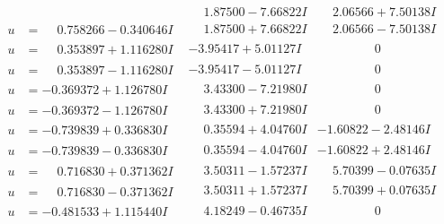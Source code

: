 \documentclass[1p]{elsarticle_modified}
\theoremstyle{definition}
\begin{document}
$$\begin{array}{c|c|c}
 & \phantom{-}1.87500 - 7.66822 I & \phantom{-}2.06566 + 7.50138 I \\ \hline\begin{aligned}
u &= \phantom{-}0.758266 - 0.340646 I\end{aligned}
 & \phantom{-}1.87500 + 7.66822 I & \phantom{-}2.06566 - 7.50138 I \\ \hline\begin{aligned}
u &= \phantom{-}0.353897 + 1.116280 I\end{aligned}
 & -3.95417 + 5.01127 I & \phantom{-0.000000 } 0 \\ \hline\begin{aligned}
u &= \phantom{-}0.353897 - 1.116280 I\end{aligned}
 & -3.95417 - 5.01127 I & \phantom{-0.000000 } 0 \\ \hline\begin{aligned}
u &= -0.369372 + 1.126780 I\end{aligned}
 & \phantom{-}3.43300 - 7.21980 I & \phantom{-0.000000 } 0 \\ \hline\begin{aligned}
u &= -0.369372 - 1.126780 I\end{aligned}
 & \phantom{-}3.43300 + 7.21980 I & \phantom{-0.000000 } 0 \\ \hline\begin{aligned}
u &= -0.739839 + 0.336830 I\end{aligned}
 & \phantom{-}0.35594 + 4.04760 I & -1.60822 - 2.48146 I \\ \hline\begin{aligned}
u &= -0.739839 - 0.336830 I\end{aligned}
 & \phantom{-}0.35594 - 4.04760 I & -1.60822 + 2.48146 I \\ \hline\begin{aligned}
u &= \phantom{-}0.716830 + 0.371362 I\end{aligned}
 & \phantom{-}3.50311 - 1.57237 I & \phantom{-}5.70399 - 0.07635 I \\ \hline\begin{aligned}
u &= \phantom{-}0.716830 - 0.371362 I\end{aligned}
 & \phantom{-}3.50311 + 1.57237 I & \phantom{-}5.70399 + 0.07635 I \\ \hline\begin{aligned}
u &= -0.481533 + 1.115440 I\end{aligned}
 & \phantom{-}4.18249 - 0.46735 I & \phantom{-0.000000 } 0 \\ \hline\begin{aligned}

\end{aligned}
\end{array}$$
\end{document}
